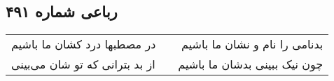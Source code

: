 \begin{center}
\section*{رباعی شماره ۴۹۱}
\label{sec:sh491}
\begin{longtable}{l p{0.5cm} r}
در مصطبها درد کشان ما باشیم
&&
بدنامی را نام و نشان ما باشیم
\\
از بد بترانی که تو شان می‌بینی
&&
چون نیک ببینی بدشان ما باشیم
\\
\end{longtable}
\end{center}
